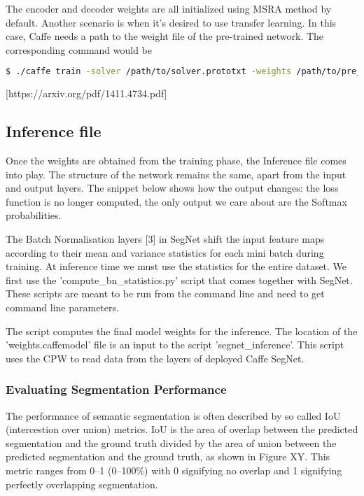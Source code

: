 The encoder and decoder weights are all initialized using MSRA method by default. Another scenario is when it's desired to use transfer learning. In this case, Caffe needs a path to the weight file of the pre-trained network. The corresponding command would be

\begin{lstlisting}[language=bash]
$ ./caffe train -solver /path/to/solver.prototxt -weights /path/to/pre_trained_weights.caffemodel
\end{lstlisting}

 [https://arxiv.org/pdf/1411.4734.pdf]

\subsection{Inference file}

Once the weights are obtained from the training phase, the Inference file comes into play. The structure of the network remains the same, apart from the input and output layers. The snippet below shows how the output changes: the loss function is no longer computed, the only output we care about are the Softmax probabilities. 

The Batch Normalisation layers [3] in SegNet shift the input feature maps according to their mean and variance statistics for each mini batch during training. At inference time we must use the statistics for the entire dataset. 
We first use the 'compute\_bn\_statistics.py' script that comes together with SegNet. These scripts are meant to be run from the command line and need to get command line parameters. 

The script computes the final model weights for the inference. The location of the 'weights.caffemodel' file is an input to the script 'segnet\_inference'. This script uses the CPW to read data from the layers of deployed Caffe SegNet. 

\subsubsection{Evaluating Segmentation Performance}

The performance of semantic segmentation is often described by so called IoU (intercestion over union) metrics. IoU is the area of overlap between the predicted segmentation and the ground truth divided by the area of union between the predicted segmentation and the ground truth, as shown in Figure XY. This metric ranges from 0–1 (0–100\%) with 0 signifying no overlap and 1 signifying perfectly overlapping segmentation.

